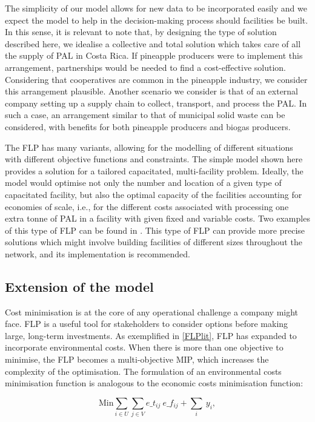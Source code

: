 The simplicity of our model allows for new data to be incorporated easily and we expect the model to help in the decision-making process should facilities be built. In this sense, it is relevant to note that, by designing the type of solution described here, we idealise a collective and total solution which takes care of all the supply of PAL in Costa Rica. If pineapple producers were to implement this arrangement, partnerships would be needed to find a cost-effective solution. Considering that cooperatives are common in the pineapple industry, we consider this arrangement plausible. Another scenario we consider is that of an external company setting up a supply chain to collect, transport, and process the PAL. In such a case, an arrangement similar to that of municipal solid waste can be considered, with benefits for both pineapple producers and biogas producers.

The FLP has many variants, allowing for the modelling of different situations with different objective functions and constraints. The simple model shown here provides a solution for a tailored capacitated, multi-facility problem. Ideally, the model would optimise not only the number and location of a given type of capacitated facility, but also the optimal capacity of the facilities accounting for economies of scale, i.e., for the different costs associated with processing one extra tonne of PAL in a facility with given fixed and variable costs. Two examples of this type of FLP can be found in \cite{wetterlund2012optimal, nordin2022optimal}. This type of FLP can provide more precise solutions which might involve building facilities of different sizes throughout the network, and its implementation is recommended.

\subsection{Extension of the model}

Cost minimisation is at the core of any operational challenge a company might face. FLP is a useful tool for stakeholders to consider options before making large, long-term investments. As exemplified in \cref{FLPlit}, FLP has expanded to incorporate environmental costs. When there is more than one objective to minimise, the FLP becomes a multi-objective MIP, which increases the complexity of the optimisation. The formulation of an environmental costs minimisation function is analogous to the economic costs minimisation function:

\begin{equation}
\label{envObjFun}
    \text{Min} \sum_{i \in U} \sum_{j \in V} e\_t_{ij} \ e\_f_{ij} + \sum _i \ y_i,
\end{equation} 

